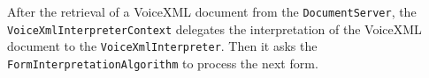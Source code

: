 \documentclass[11pt,a4paper]{article}
\begin{document}
\begin{center}
\end{center}

After the retrieval of a VoiceXML document from the \texttt{Document\-Server}, the
\texttt{VoiceXml\-Interpreter\-Context} delegates the interpretation of the VoiceXML
document to the \texttt{VoiceXmlInterpreter}. Then it asks the 
\texttt{FormInterpretation\-Algorithm} to process the next form.
\end{document}
